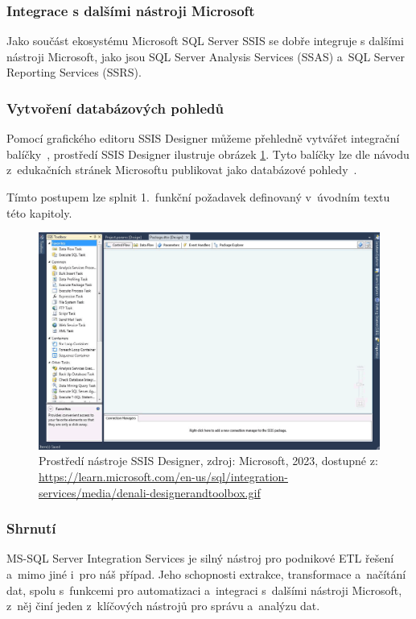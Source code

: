 \subsubsection{Integrace s dalšími nástroji Microsoft} Jako součást ekosystému Microsoft SQL Server SSIS se dobře integruje s dalšími nástroji Microsoft, jako jsou SQL Server Analysis Services (SSAS) a~SQL Server Reporting Services (SSRS).

\subsubsection{Vytvoření databázových pohledů}
Pomocí grafického editoru SSIS Designer můžeme přehledně vytvářet integrační balíčky~\cite{SSISDesigner:online}, prostředí SSIS Designer ilustruje obrázek \ref{fig:SSISDesigner}.
Tyto balíčky lze dle návodu z~edukačních stránek Microsoftu publikovat jako databázové pohledy~\cite{SSISViews:online}. 

Tímto postupem lze splnit 1.~funkční požadavek definovaný v~úvodním textu této kapitoly.

\begin{figure}
    \centering
    \includegraphics[width=0.75\linewidth]{img/SSIS Designer.png}
    \caption{Prostředí nástroje SSIS Designer, zdroj: Microsoft, 2023, dostupné z: \url{https://learn.microsoft.com/en-us/sql/integration-services/media/denali-designerandtoolbox.gif}}
    \label{fig:SSISDesigner}
\end{figure}

\subsubsection{Shrnutí}
MS-SQL Server Integration Services je silný nástroj pro podnikové ETL řešení a~mimo jiné i~pro náš případ.
Jeho schopnosti extrakce, transformace a~načítání dat, spolu s~funkcemi pro automatizaci a~integraci s~dalšími nástroji Microsoft, z~něj činí jeden z~klíčových nástrojů pro správu a~analýzu dat.


